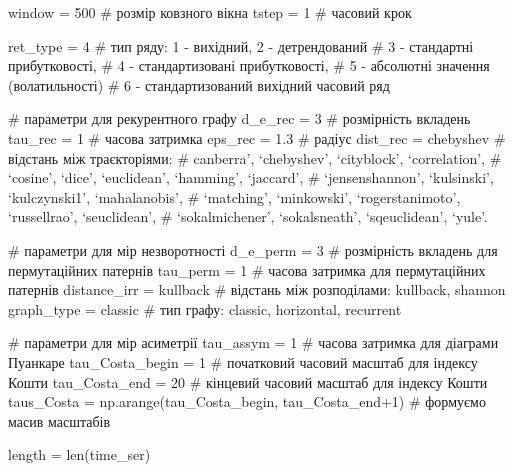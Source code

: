 \documentclass[
  letterpaper,
]{report}
\newenvironment{Shaded}{\begin{snugshade}}{\end{snugshade}}
\newcommand{\BuiltInTok}[1]{\textcolor[rgb]{0.00,0.23,0.31}{#1}}
\newcommand{\CommentTok}[1]{\textcolor[rgb]{0.37,0.37,0.37}{#1}}
\newcommand{\DecValTok}[1]{\textcolor[rgb]{0.68,0.00,0.00}{#1}}
\newcommand{\FloatTok}[1]{\textcolor[rgb]{0.68,0.00,0.00}{#1}}
\newcommand{\NormalTok}[1]{\textcolor[rgb]{0.00,0.23,0.31}{#1}}
\newcommand{\OperatorTok}[1]{\textcolor[rgb]{0.37,0.37,0.37}{#1}}
\newcommand{\StringTok}[1]{\textcolor[rgb]{0.13,0.47,0.30}{#1}}
\begin{document}
\begin{Shaded}
\begin{Highlighting}[]
\NormalTok{window }\OperatorTok{=} \DecValTok{500} \CommentTok{\# розмір ковзного вікна}
\NormalTok{tstep }\OperatorTok{=} \DecValTok{1} \CommentTok{\# часовий крок}

\NormalTok{ret\_type }\OperatorTok{=} \DecValTok{4} \CommentTok{\# тип ряду: 1 {-} вихідний, 2 {-} детрендований}
                        \CommentTok{\# 3 {-} стандартні прибутковості, }
                        \CommentTok{\# 4 {-} стандартизовані прибутковості, }
                        \CommentTok{\# 5 {-} абсолютні значення (волатильності)}
                        \CommentTok{\# 6 {-} стандартизований вихідний часовий ряд}


\CommentTok{\# параметри для рекурентного графу}
\NormalTok{d\_e\_rec }\OperatorTok{=} \DecValTok{3} \CommentTok{\# розмірність вкладень}
\NormalTok{tau\_rec }\OperatorTok{=} \DecValTok{1} \CommentTok{\# часова затримка}
\NormalTok{eps\_rec }\OperatorTok{=} \FloatTok{1.3} \CommentTok{\# радіус}
\NormalTok{dist\_rec }\OperatorTok{=} \StringTok{\textquotesingle{}chebyshev\textquotesingle{}} \CommentTok{\# відстань між траєкторіями: }
                       \CommentTok{\# canberra’, ‘chebyshev’, ‘cityblock’, ‘correlation’, }
                       \CommentTok{\# ‘cosine’, ‘dice’, ‘euclidean’, ‘hamming’, ‘jaccard’, }
                       \CommentTok{\# ‘jensenshannon’, ‘kulsinski’, ‘kulczynski1’, ‘mahalanobis’, }
                       \CommentTok{\# ‘matching’, ‘minkowski’, ‘rogerstanimoto’, ‘russellrao’, ‘seuclidean’, }
                       \CommentTok{\# ‘sokalmichener’, ‘sokalsneath’, ‘sqeuclidean’, ‘yule’.}


\CommentTok{\# параметри для мір незворотності}
\NormalTok{d\_e\_perm }\OperatorTok{=} \DecValTok{3}              \CommentTok{\# розмірність вкладень для пермутаційних патернів }
\NormalTok{tau\_perm  }\OperatorTok{=} \DecValTok{1}             \CommentTok{\# часова затримка для пермутаційних патернів}
\NormalTok{distance\_irr }\OperatorTok{=} \StringTok{\textquotesingle{}kullback\textquotesingle{}} \CommentTok{\# відстань між розподілами: kullback, shannon}
\NormalTok{graph\_type }\OperatorTok{=} \StringTok{\textquotesingle{}classic\textquotesingle{}}    \CommentTok{\# тип графу: classic, horizontal, recurrent}

\CommentTok{\# параметри для мір асиметрії}
\NormalTok{tau\_assym }\OperatorTok{=} \DecValTok{1}                 \CommentTok{\# часова затримка для діаграми Пуанкаре}
\NormalTok{tau\_Costa\_begin }\OperatorTok{=} \DecValTok{1}           \CommentTok{\# початковий часовий масштаб для індексу Кошти}
\NormalTok{tau\_Costa\_end }\OperatorTok{=} \DecValTok{20}            \CommentTok{\# кінцевий часовий масштаб для індексу Кошти}
\NormalTok{taus\_Costa }\OperatorTok{=}\NormalTok{ np.arange(tau\_Costa\_begin, tau\_Costa\_end}\OperatorTok{+}\DecValTok{1}\NormalTok{) }\CommentTok{\# формуємо масив масштабів}
                
\NormalTok{length }\OperatorTok{=} \BuiltInTok{len}\NormalTok{(time\_ser)}
\end{Highlighting}
\end{Shaded}
\end{document}
